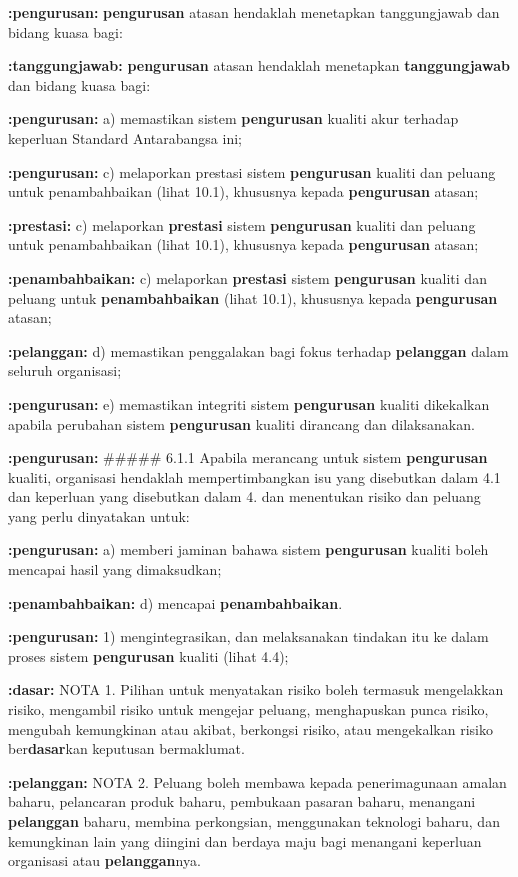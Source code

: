 \documentclass{article}
\begin{document}
\textbf{:pengurusan:} \textbf{pengurusan} atasan hendaklah menetapkan tanggungjawab dan bidang kuasa bagi:

\textbf{:tanggungjawab:} \textbf{pengurusan} atasan hendaklah menetapkan \textbf{tanggungjawab} dan bidang kuasa bagi:

\textbf{:pengurusan:} a) memastikan sistem \textbf{pengurusan} kualiti akur terhadap keperluan Standard Antarabangsa
ini;

\textbf{:pengurusan:} c) melaporkan prestasi sistem \textbf{pengurusan} kualiti dan peluang untuk penambahbaikan (lihat
10.1), khususnya kepada \textbf{pengurusan} atasan;

\textbf{:prestasi:} c) melaporkan \textbf{prestasi} sistem \textbf{pengurusan} kualiti dan peluang untuk penambahbaikan (lihat
10.1), khususnya kepada \textbf{pengurusan} atasan;

\textbf{:penambahbaikan:} c) melaporkan \textbf{prestasi} sistem \textbf{pengurusan} kualiti dan peluang untuk \textbf{penambahbaikan} (lihat
10.1), khususnya kepada \textbf{pengurusan} atasan;

\textbf{:pelanggan:} d) memastikan penggalakan bagi fokus terhadap \textbf{pelanggan} dalam seluruh organisasi;

\textbf{:pengurusan:} e) memastikan integriti sistem \textbf{pengurusan} kualiti dikekalkan apabila perubahan sistem
\textbf{pengurusan} kualiti dirancang dan dilaksanakan.

\textbf{:pengurusan:} \#\#\#\#\# 6.1.1 Apabila merancang untuk sistem \textbf{pengurusan} kualiti, organisasi hendaklah
mempertimbangkan isu yang disebutkan dalam 4.1 dan keperluan yang disebutkan dalam 4.
dan menentukan risiko dan peluang yang perlu dinyatakan untuk:

\textbf{:pengurusan:} a) memberi jaminan bahawa sistem \textbf{pengurusan} kualiti boleh mencapai hasil yang
dimaksudkan;

\textbf{:penambahbaikan:} d) mencapai \textbf{penambahbaikan}.

\textbf{:pengurusan:} 1) mengintegrasikan, dan melaksanakan tindakan itu ke dalam proses sistem
\textbf{pengurusan} kualiti (lihat 4.4);

\textbf{:dasar:} NOTA 1. Pilihan untuk menyatakan risiko boleh termasuk mengelakkan risiko, mengambil risiko untuk
mengejar peluang, menghapuskan punca risiko, mengubah kemungkinan atau akibat, berkongsi risiko,
atau mengekalkan risiko ber\textbf{dasar}kan keputusan bermaklumat.

\textbf{:pelanggan:} NOTA 2. Peluang boleh membawa kepada penerimagunaan amalan baharu, pelancaran produk
baharu, pembukaan pasaran baharu, menangani \textbf{pelanggan} baharu, membina perkongsian,
menggunakan teknologi baharu, dan kemungkinan lain yang diingini dan berdaya maju bagi menangani
keperluan organisasi atau \textbf{pelanggan}nya.
\end{document}

